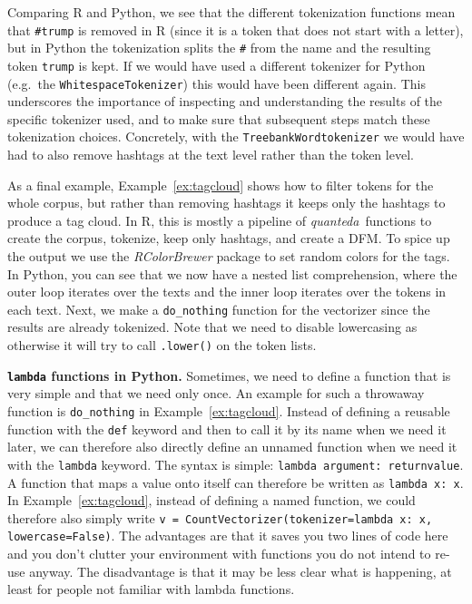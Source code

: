 Comparing R and Python, we see that the different tokenization functions mean that \verb|#trump| is removed in R (since it is a token that does not start with a letter),
but in Python the tokenization splits the \verb|#| from the name and the resulting token \verb|trump| is kept.
If we would have used a different tokenizer for Python (e.g.\ the \texttt{WhitespaceTokenizer}) this would have been different again.
This underscores the importance of inspecting and understanding the results of the specific tokenizer used,
and to make sure that subsequent steps match these tokenization choices.
Concretely, with the \texttt{TreebankWordtokenizer} we would have had to also remove hashtags at the text level rather than the token level.


As a final example, Example~\ref{ex:tagcloud} shows how to filter tokens for the whole corpus, but rather than removing hashtags it keeps only the hashtags to produce a tag cloud.
In R, this is mostly a pipeline of \emph{quanteda}\ functions to create the corpus, tokenize, keep only hashtags, and create a DFM.
To spice up the output we use the \emph{RColorBrewer} package to set random colors for the tags.
In Python, you can see that we now have a nested list comprehension, where the outer loop iterates over the texts and the inner loop iterates over the tokens in each text.
Next, we make a \verb|do_nothing| function for the vectorizer since the results are already tokenized.
Note that we need to disable lowercasing as otherwise it will try to call \verb|.lower()| on the token lists.

\begin{feature}
  \textbf{\texttt{lambda} functions in Python.}
  Sometimes, we need to define a function that is very simple and that we need only once.
  An example for such a throwaway function is \verb|do_nothing| in Example~\ref{ex:tagcloud}.
  Instead of defining a reusable function with the \texttt{def} keyword and then to call it by its name when we need it later,
  we can therefore also directly define an unnamed function when we need it with the \texttt{lambda} keyword.
  The syntax is simple: \verb|lambda argument: returnvalue|.
  A function that maps a value onto itself can therefore be written as \verb|lambda x: x|.
  In Example~\ref{ex:tagcloud}, instead of defining a named function,
  we could therefore also simply write \verb|v = CountVectorizer(tokenizer=lambda x: x, lowercase=False)|.
  The advantages are that it saves you two lines of code here and  you don't clutter your environment with functions you do not intend to re-use anyway.
  The disadvantage is that it may be less clear what is happening, at least for people not familiar with lambda functions.
\end{feature}




